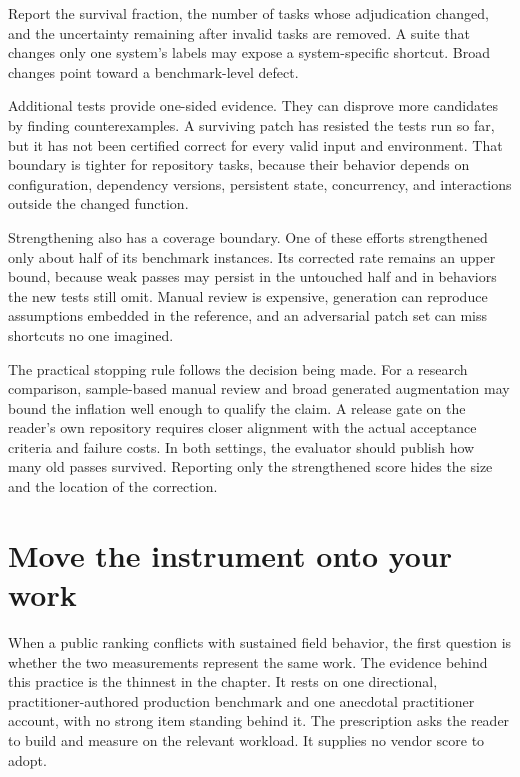 Report the survival fraction, the number of tasks whose adjudication changed, and the uncertainty remaining after invalid tasks are removed. A suite that changes only one system's labels may expose a system-specific shortcut. Broad changes point toward a benchmark-level defect.

Additional tests provide one-sided evidence. They can disprove more candidates by finding counterexamples. A surviving patch has resisted the tests run so far, but it has not been certified correct for every valid input and environment. That boundary is tighter for repository tasks, because their behavior depends on configuration, dependency versions, persistent state, concurrency, and interactions outside the changed function.

Strengthening also has a coverage boundary. One of these efforts strengthened only about half of its benchmark instances. Its corrected rate remains an upper bound, because weak passes may persist in the untouched half and in behaviors the new tests still omit. Manual review is expensive, generation can reproduce assumptions embedded in the reference, and an adversarial patch set can miss shortcuts no one imagined.

The practical stopping rule follows the decision being made. For a research comparison, sample-based manual review and broad generated augmentation may bound the inflation well enough to qualify the claim. A release gate on the reader's own repository requires closer alignment with the actual acceptance criteria and failure costs. In both settings, the evaluator should publish how many old passes survived. Reporting only the strengthened score hides the size and the location of the correction.

\hypertarget{move-the-instrument-onto-your-work}{%
\section{Move the instrument onto your work}\label{move-the-instrument-onto-your-work}}

When a public ranking conflicts with sustained field behavior, the first question is whether the two measurements represent the same work. The evidence behind this practice is the thinnest in the chapter. It rests on one directional, practitioner-authored production benchmark and one anecdotal practitioner account, with no strong item standing behind it. The prescription asks the reader to build and measure on the relevant workload. It supplies no vendor score to adopt.

